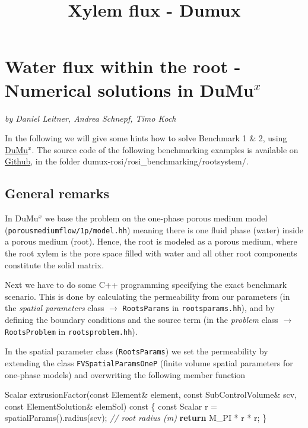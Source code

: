 \documentclass[11pt]{article}
\title{Xylem flux - Dumux}
\newenvironment{Shaded}{}{}
\newcommand{\CommentTok}[1]{\textcolor[rgb]{0.38,0.63,0.69}{\textit{{#1}}}}
\newcommand{\NormalTok}[1]{{#1}}
\newcommand{\ControlFlowTok}[1]{\textcolor[rgb]{0.00,0.44,0.13}{\textbf{{#1}}}}
\newcommand{\AttributeTok}[1]{\textcolor[rgb]{0.49,0.56,0.16}{{#1}}}
\begin{document}
    
    
    \maketitle
    
    

    
    \section{\texorpdfstring{Water flux within the root - Numerical
solutions in
DuMu\({}^x\)}{Water flux within the root - Numerical solutions in DuMu\{\}\^{}x}}\label{water-flux-within-the-root---numerical-solutions-in-dumux}

\emph{by Daniel Leitner, Andrea Schnepf, Timo Koch}

    In the following we will give some hints how to solve Benchmark 1 \& 2,
using \href{www.dumux.org}{DuMu\({}^x\)}. The source code of the
following benchmarking examples is available on
\href{https://github.com/Plant-Root-Soil-Interactions-Modelling/dumux-rosi.git}{Github},
in the folder dumux-rosi/rosi\_benchmarking/rootsystem/.

    \subsection{General remarks}\label{general-remarks}

    In DuMu\({}^x\) we base the problem on the one-phase porous medium model
(\texttt{porousmediumflow/1p/model.hh}) meaning there is one fluid phase
(water) inside a porous medium (root). Hence, the root is modeled as a
porous medium, where the root xylem is the pore space filled with water
and all other root components constitute the solid matrix.

Next we have to do some C++ programming specifying the exact benchmark
scenario. This is done by calculating the permeability from our
parameters (in the \emph{spatial parameters} class \(\rightarrow\)
\texttt{RootsParams} in \texttt{rootsparams.hh}), and by defining the
boundary conditions and the source term (in the \emph{problem} class
\(\rightarrow\) \texttt{RootsProblem} in \texttt{rootsproblem.hh}).

    In the spatial parameter class (\texttt{RootsParams}) we set the
permeability by extending the class \texttt{FVSpatialParamsOneP} (finite
volume spatial parameters for one-phase models) and overwriting the
following member function

    \begin{Shaded}
\begin{Highlighting}[]
\NormalTok{Scalar extrusionFactor(}\AttributeTok{const}\NormalTok{ Element& element,}
                       \AttributeTok{const}\NormalTok{ SubControlVolume& scv,}
                       \AttributeTok{const}\NormalTok{ ElementSolution& elemSol) }\AttributeTok{const}
\NormalTok{\{}
    \AttributeTok{const}\NormalTok{ Scalar r = spatialParams().radius(scv); }\CommentTok{// root radius (m)}
    \ControlFlowTok{return}\NormalTok{ M_PI * r * r;}
\NormalTok{\}}
\end{Highlighting}
\end{Shaded}
\end{document}
